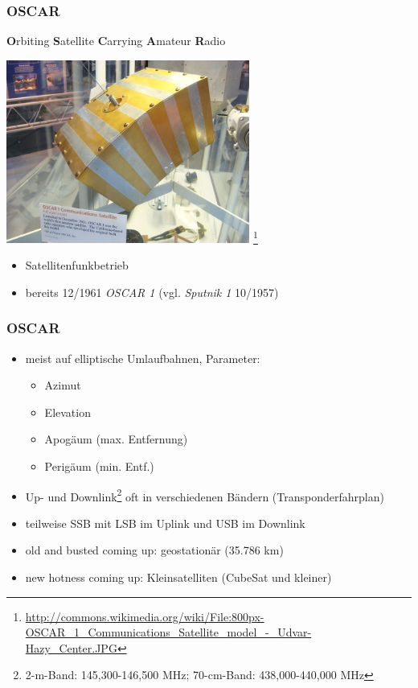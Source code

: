 \begin{frame}
    \frametitle{OSCAR}


    \textbf{O}rbiting \textbf{S}atellite \textbf{C}arrying \textbf{A}mateur \textbf{R}adio

    \begin{center}
        \includegraphics[width=0.6\textwidth,height=.5\textheight,keepaspectratio]{bv11/OSCAR1.jpg}
        \footnote{\tiny \url{http://commons.wikimedia.org/wiki/File:800px-OSCAR_1_Communications_Satellite_model_-_Udvar-Hazy_Center.JPG}}
    \end{center}

    \begin{itemize}
        \item Satellitenfunkbetrieb
        \item bereits 12/1961 \emph{OSCAR 1} (vgl. \emph{Sputnik 1} 10/1957)
    \end{itemize}

\end{frame}

\begin{frame}
    \frametitle{OSCAR}

    \begin{itemize}
        \item meist auf elliptische Umlaufbahnen, Parameter:
        \begin{itemize}
            \item Azimut
            \item Elevation
            \item Apogäum (max. Entfernung)
            \item Perigäum (min. Entf.)
        \end{itemize}
        \item Up- und Downlink\footnote{2-m-Band: 145,300-146,500 MHz; 70-cm-Band: 438,000-440,000 MHz}
              oft in verschiedenen Bändern (Transponderfahrplan)
        \item teilweise SSB mit LSB im Uplink und USB im Downlink
        \item old and busted coming up: geostationär (35.786 km)
        \item new hotness coming up: Kleinsatelliten (CubeSat und kleiner)
    \end{itemize}

\end{frame}

